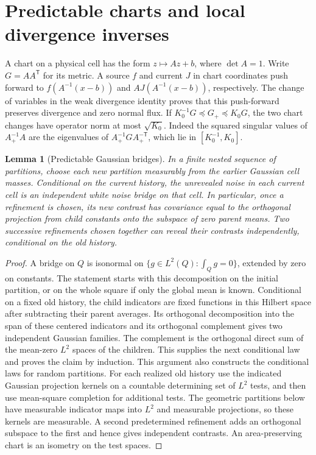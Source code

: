 \documentclass[11pt]{article}
\newtheorem{lemma}{Lemma}
\newcommand{\1}{\mathbf{1}}
\numberwithin{equation}{section}
\begin{document}
\tableofcontents
\medskip

\section{Predictable charts and local divergence inverses}
\label{sec:local-geometry}
\label{sec:sharp-local-inverse}

A chart on a physical cell has the form \(z\mapsto Az+b\), where
\(\det A=1\). Write \(G=AA^{\mathsf T}\) for its metric. A source
\(f\) and current \(J\) in chart coordinates push forward to
\(f(A^{-1}(x-b))\) and \(AJ(A^{-1}(x-b))\), respectively. The
change of variables in the weak divergence identity proves that
this push-forward preserves divergence and zero normal flux.
If \(K_0^{-1}G\preceq G_+\preceq K_0G\), the two chart
changes have operator norm at most \(\sqrt{K_0}\).
Indeed the squared singular values of \(A_+^{-1}A\) are
the eigenvalues of \(A_+^{-1}G A_+^{-\mathsf T}\), which lie
in \([K_0^{-1},K_0]\).

\begin{lemma}[Predictable Gaussian bridges]\label{lem:predictable-bridge}
In a finite nested sequence of partitions, choose each new
partition measurably from the earlier Gaussian cell masses.
Conditional on the current history, the unrevealed noise in
each current cell is an independent white noise bridge on
that cell. In particular, once a refinement is chosen, its
new contrast has covariance equal to the orthogonal projection
from child constants onto the subspace of zero parent means.
Two successive refinements chosen together can reveal their
contrasts independently, conditional on the old history.
\end{lemma}

\begin{proof}
A bridge on \(Q\) is isonormal on
\(\{g\in L^2(Q):\int_Qg=0\}\), extended by zero on constants.
The statement starts with this decomposition on the initial
partition, or on the whole square if only the global mean is
known. Conditional on a fixed old history, the child indicators
are fixed functions in this Hilbert space after subtracting their
parent averages. Its orthogonal decomposition into the span
of these centered indicators and its orthogonal complement
gives two independent Gaussian families. The complement is
the orthogonal direct sum of the mean-zero \(L^2\) spaces of
the children. This supplies the next conditional law and proves
the claim by induction. This argument also constructs the
conditional laws for random partitions. For each realized old
history use the indicated Gaussian projection kernels on a
countable determining set of \(L^2\) tests, and then use
mean-square completion for additional tests. The geometric
partitions below have measurable indicator maps into \(L^2\)
and measurable projections, so these kernels are measurable.
A second predetermined refinement adds an orthogonal subspace
to the first and hence gives independent contrasts. An
area-preserving chart is an isometry on the test spaces.
\end{proof}
\end{document}
